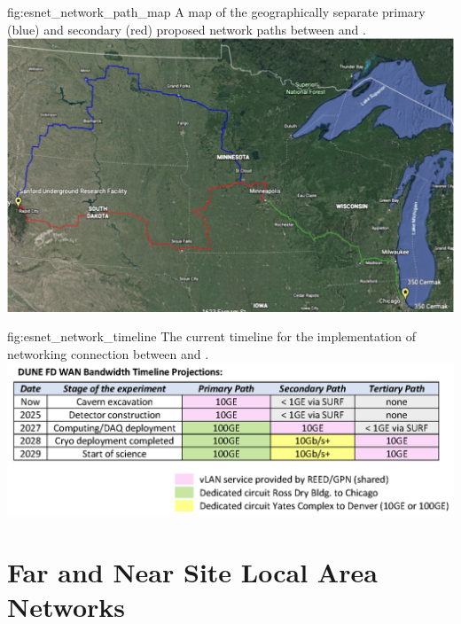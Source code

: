 \documentclass[../main-v1.tex]{subfiles}
\begin{document}
\begin{dunefigure}
{fig:esnet_network_path_map} 
{A map of the geographically separate primary (blue) and secondary (red) proposed network paths between  and . %
}
\includegraphics[width=0.9\columnwidth]{graphics/Networking/DUNE_ESNet_network_path.png}
\end{dunefigure}

\begin{dunefigure}
{fig:esnet_network_timeline} 
{The current timeline for the implementation of networking connection between  and .}
\includegraphics[width=0.9\columnwidth]{graphics/Networking/DUNE_network_Timeline_3-14-2022.png}
\end{dunefigure}


\section{Far and Near Site Local Area Networks}
\end{document}
